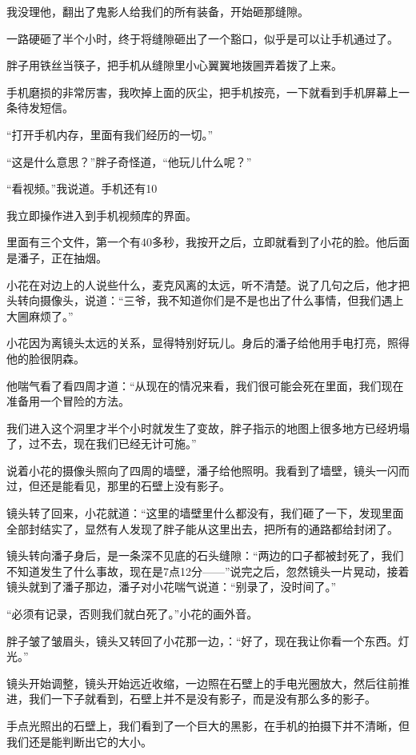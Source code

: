 我没理他，翻出了鬼影人给我们的所有装备，开始砸那缝隙。

一路硬砸了半个小时，终于将缝隙砸出了一个豁口，似乎是可以让手机通过了。

胖子用铁丝当筷子，把手机从缝隙里小心翼翼地拨圌弄着拨了上来。

手机磨损的非常厉害，我吹掉上面的灰尘，把手机按亮，一下就看到手机屏幕上一条待发短信。

“打开手机内存，里面有我们经历的一切。”

“这是什么意思？”胖子奇怪道，“他玩儿什么呢？”

“看视频。”我说道。手机还有10%

我立即操作进入到手机视频库的界面。

里面有三个文件，第一个有40多秒，我按开之后，立即就看到了小花的脸。他后面是潘子，正在抽烟。

小花在对边上的人说些什么，麦克风离的太远，听不清楚。说了几句之后，他才把头转向摄像头，说道：“三爷，我不知道你们是不是也出了什么事情，但我们遇上大圌麻烦了。”

小花因为离镜头太远的关系，显得特别好玩儿。身后的潘子给他用手电打亮，照得他的脸很阴森。

他喘气看了看四周才道：“从现在的情况来看，我们很可能会死在里面，我们现在准备用一个冒险的方法。

我们进入这个洞里才半个小时就发生了变故，胖子指示的地图上很多地方已经坍塌了，过不去，现在我们已经无计可施。”

说着小花的摄像头照向了四周的墙壁，潘子给他照明。我看到了墙壁，镜头一闪而过，但还是能看见，那里的石壁上没有影子。

镜头转了回来，小花就道：“这里的墙壁里什么都没有，我们砸了一下，发现里面全部封结实了，显然有人发现了胖子能从这里出去，把所有的通路都给封闭了。

镜头转向潘子身后，是一条深不见底的石头缝隙：“两边的口子都被封死了，我们不知道发生了什么事故，现在是7点12分——”说完之后，忽然镜头一片晃动，接着镜头就到了潘子那边，潘子对小花喘气说道：“别录了，没时间了。”

“必须有记录，否则我们就白死了。”小花的画外音。

胖子皱了皱眉头，镜头又转回了小花那一边，：“好了，现在我让你看一个东西。灯光。”

镜头开始调整，镜头开始远近收缩，一边照在石壁上的手电光圈放大，然后往前推进，我们一下子就看到，石壁上并不是没有影子，而是没有那么多的影子。

手点光照出的石壁上，我们看到了一个巨大的黑影，在手机的拍摄下并不清晰，但我们还是能判断出它的大小。

